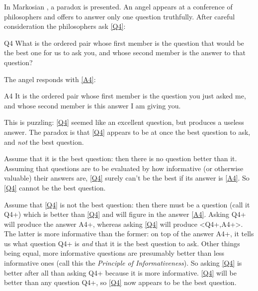 In Markosian \autocite[]{Markosian_1997}, a paradox is presented.
An angel appears at a conference of philosophers and offers to answer only one question truthfully.
After careful consideration the philosophers ask \ref{Q4}:\footnotemark
{}

	\begin{principle}{Q4}\label{Q4}
	What is the ordered pair whose first member is the question that would be the best one for us to ask you, and whose second member is the answer to that question? 
	\end{principle}

The angel responds with \ref{A4}:

	\begin{principle}{A4}\label{A4}
	It is the ordered pair whose first member is the question you just asked me, and whose second member is this answer I am giving you. 
	\end{principle}

This is puzzling: \ref{Q4} seemed like an excellent question, but produces a useless answer.
The paradox is that \ref{Q4} appears to be at once the best question to ask, and \emph{not} the best question.

Assume that it is the best question: then there is no question better than it.
Assuming that questions are to be evaluated by how informative (or otherwise valuable) their answers are, \ref{Q4} surely can't be the best if its answer is \ref{A4}.
So \ref{Q4} cannot be the best question.

Assume that \ref{Q4} is not the best question: then there must be a question (call it Q4+) which is better than \ref{Q4} and will figure in the answer \ref{A4}.
Asking Q4+ will produce the answer A4+, whereas asking \ref{Q4} will produce <Q4+,A4+>.
The latter is more informative than the former: on top of the answer A4+, it tells us what question Q4+ is \emph{and} that it is the best question to ask.
Other things being equal, more informative questions are presumably better than less informative ones (call this the \textit{Principle of Informativeness}).
So asking \ref{Q4} is better after all than asking Q4+ because it is more informative.
\ref{Q4} will be better than any question Q4+, so \ref{Q4} now appears to be the best question.

